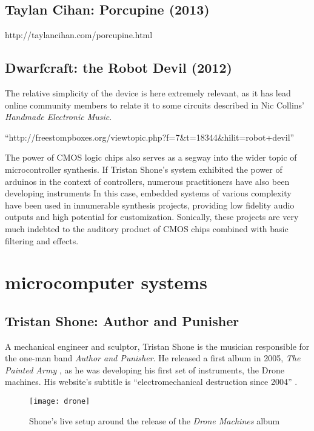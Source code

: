 \subsection{Taylan Cihan: Porcupine (2013)}

http://taylancihan.com/porcupine.html

\subsection{Dwarfcraft: the Robot Devil (2012)}

The relative simplicity of the device is here extremely relevant, as it has lead online community members to relate it to some circuits described in Nic Collins' \emph{Handmade Electronic Music}. 

``http://freestompboxes.org/viewtopic.php?f=7&t=18344&hilit=robot+devil''

The power of CMOS logic chips also serves as a segway into the wider topic of microcontroller synthesis. If Tristan Shone's system exhibited the power of arduinos in the context of controllers, numerous practitioners have also been developing instruments  In this case, embedded systems of various complexity have been used in innumerable synthesis projects, providing low fidelity audio outputs and high potential for customization. Sonically, these projects are very much indebted to the auditory product of CMOS chips combined with basic filtering and effects. 

\section{microcomputer systems}

\subsection{Tristan Shone: Author and Punisher}

A mechanical engineer and sculptor, Tristan Shone is the musician responsible for the one-man band \emph{Author and Punisher}. He released a first album in 2005, \emph{The Painted Army} \citep{shone,2005}, as he was developing his first set of instruments, the Drone machines. His website's subtitle is ``electromechanical destruction since 2004'' \citep{shone2004}.

	\begin{figure}[h!]
	  \caption{Shone's live setup around the release of the \emph{Drone Machines} album}
	  \centering
	    \texttt{[image: drone]}
	\end{figure}
	
